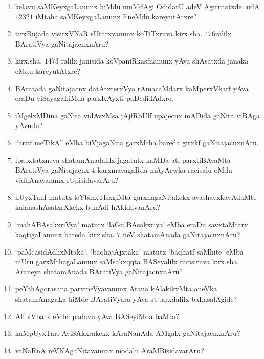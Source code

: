 \begin{enumerate}
\item kelavu saMKeyxgaLanunx hiMdu muMdAgi OdidarU adeV Agirutatxde. udA $12321$ iMtaha saMKeyxgaLanunx EneMdu kareyutAtxre?
  
\item tirxBujada visitxVNaR sUtarxvanunx koTiTxruva kirx.sha. $476$ralilx BAratiVya gaNitajacnxnAru?
  
\item kirx.sha. $1473$ ralilx janisida koVpaniRkasfnanunx yAva shAsatxda janaka eMdu kareyutAtxre?
  
\item BAratada gaNitajacnx datAtxterxVya rAmacaMdarx kaMperxVkarf yAva eraDu viSayagaLiMda parxKAyxti paDedidAdxre. 
  
\item iMgelxMDina gaNita vidAvxMsa jAjfRbUlf upajecnx mADida gaNita viBAga yAvudu?
  
\item``aritf meTikA'' eMba biVjagaNita garxMtha bareda girxkf gaNitajacnxnAru.

\item ipapxtatxneya shatamAnadalilx jagatutx kaMDa ati parxtiBAvaMta BAratiVya gaNitajacnx $4$ karxmavagaRda mAyAcwka racisalu oMdu vidhAnavanunx rUpisidavarAru?
  
\item nUyxTanf matutx leYbinxTfsxgiMta garxhagaNitakekx avashayxkavAdaMte kalanashAsatxrXkekx bunAdi hAkidavanAru?
  
\item `mahABAsakxriVya' matutx `laGu BAsakxriya' eMba eraDu savxtaMtarx kaqtigaLanunx bareda kirx.sha. $7$ neV shatamAnada gaNitajacnxnAru?
  
\item `paMcasidAdhxMtaka', `baqhajAjxtaka' matutx `baqhatf saMhite' eMba mUru garxMthagaLanunx saMsakxqqta BASeyalilx racisiruva kirx.sha. Araneya shatamAnada BAratiVya gaNitajacnxnAru?
  
\item peYthAgorasana parxmeVyavanunx Atana kAlakikxMta aneVka shatamAnagaLa hiMde BAratiVyara yAva sUtarxdalilx baLasalAgide?
  
\item AlfbiVbarx eMba padavu yAva BASeyiMda baMta?
  
\item kaMpUyxTarf AviSAkxrakekx kAraNanAda AMgalx gaNitajacnxnAru?
  
 \item vaNaRnA reVKAgaNitavanunx modalu AraMBisidavarAru?


\end{enumerate}
